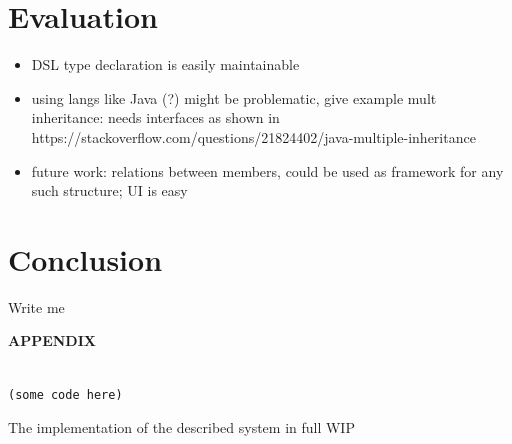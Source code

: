 \documentclass[oribibl]{llncs}
\begin{document}
\section{Evaluation}
\label{sec:evaluation}

\begin{itemize}
\item DSL type declaration is easily maintainable
\item using langs like Java (?) might be problematic, give example mult inheritance: needs interfaces as shown in https://stackoverflow.com/questions/21824402/java-multiple-inheritance
\item future work: relations between members, could be used as framework for any such structure; UI is easy 
\end{itemize}


\section{Conclusion}
\label{sec:conclusion}
Write me 

\newpage
\nocite{*}



\newpage
    \begin{center}
      {\bf APPENDIX}
    \end{center}
\label{sec:appendix}

\begin{listing}[]%
\begin{verbatim}

(some code here)

\end{verbatim}
\caption{The implementation of the described system in full WIP}
\label{lst:entire-implementation}
\end{listing}
\end{document}
